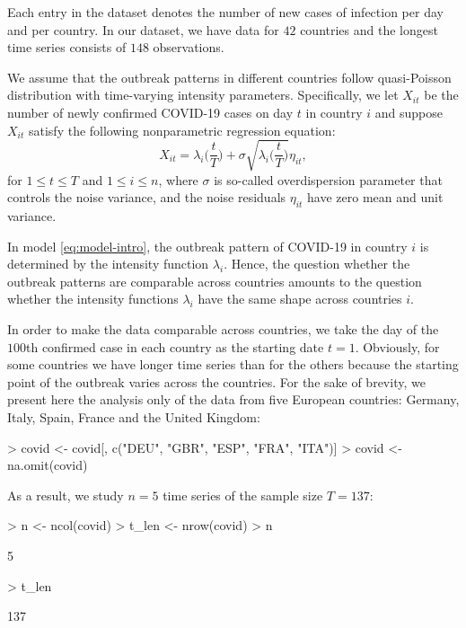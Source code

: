 \documentclass[a4paper]{article}
\begin{document}
Each entry in the dataset denotes the number of new cases of infection per day and per country. In our dataset, we have data for $42$ countries and the longest time series consists of $148$ observations.

We assume that the outbreak patterns in different countries follow quasi-Poisson distribution with time-varying intensity parameters. Specifically, we let $X_{it}$ be the number of newly confirmed COVID-19 cases on day $t$ in country $i$ and suppose $X_{it}$ satisfy the following nonparametric regression equation:
\begin{equation}\label{eq:model-intro}
X_{it} = \lambda_i\Big(\frac{t}{T}\Big) + \sigma \sqrt{\lambda_i\Big(\frac{t}{T}\Big)}\eta_{it},
\end{equation}
for $1 \le t \le T$ and $1 \le i \le n$, where $\sigma$ is so-called overdispersion parameter that controls the noise variance, and the noise residuals $\eta_{it}$ have zero mean and unit variance.

In model \eqref{eq:model-intro}, the outbreak pattern of COVID-19 in country $i$ is determined by the intensity function $\lambda_i$. Hence, the question whether the outbreak patterns are comparable across countries amounts to the question whether the intensity functions $\lambda_i$ have the same shape across countries $i$.

In order to make the data comparable across countries, we take the day of the $100$th confirmed case in each country as the starting date $t = 1$. Obviously, for some countries we have longer time series than for the others because the starting point of the outbreak varies across the countries. For the sake of brevity, we present here the analysis only of the data from five European countries: Germany, Italy, Spain, France and the United Kingdom:

\begin{Schunk}
\begin{Sinput}
> covid <- covid[, c("DEU", "GBR", "ESP", "FRA", "ITA")]
> covid <- na.omit(covid)
\end{Sinput}
\end{Schunk}

As a result, we study $n = 5$ time series of the sample size $T = 137$:

\begin{Schunk}
\begin{Sinput}
> n     <- ncol(covid)
> t_len <- nrow(covid)
> n
\end{Sinput}
\begin{Soutput}
[1] 5
\end{Soutput}
\begin{Sinput}
> t_len
\end{Sinput}
\begin{Soutput}
[1] 137
\end{Soutput}
\end{Schunk}
\end{document}
